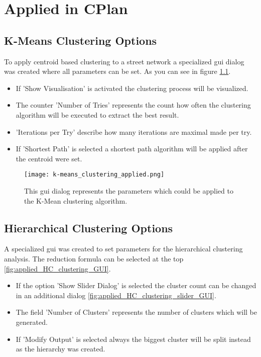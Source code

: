 \appendix
\chapter{Applied in CPlan}
\section{K-Means Clustering Options}
To apply centroid based clustering to a street network a specialized gui dialog was created where all parameters can be set. As you can see in figure \ref{fig:applied_k-means_GUI}.
\begin{itemize}
    \item If 'Show Visualisation' is activated the clustering process will be visualized.
    \item The counter 'Number of Tries' represents the count how often the clustering algorithm will be executed to extract the best result.
    \item 'Iterations per Try' describe how many iterations are maximal made per try. 
    \item If 'Shortest Path' is selected a shortest path algorithm will be applied after the centroid were set.
\end{itemize}
\begin{figure}[ht]
    \centering
    \texttt{[image: k-means\_clustering\_applied.png]}
    \caption{This gui dialog represents the parameters which could be applied to the K-Mean clustering algorithm.}
    \label{fig:applied_k-means_GUI}
\end{figure}

\section{Hierarchical Clustering Options}
A specialized gui was created to set parameters for the hierarchical clustering analysis. The reduction formula can be selected at the top \ref{fig:applied_HC_clustering_GUI}.
\begin{itemize}
    \item If the option 'Show Slider Dialog' is selected the cluster count can be changed in an additional dialog \ref{fig:applied_HC_clustering_slider_GUI}.
    \item The field 'Number of Clusters' represents the number of clusters which will be generated.
    \item If 'Modify Output' is selected always the biggest cluster will be split instead as the hierarchy was created.
\end{itemize}

